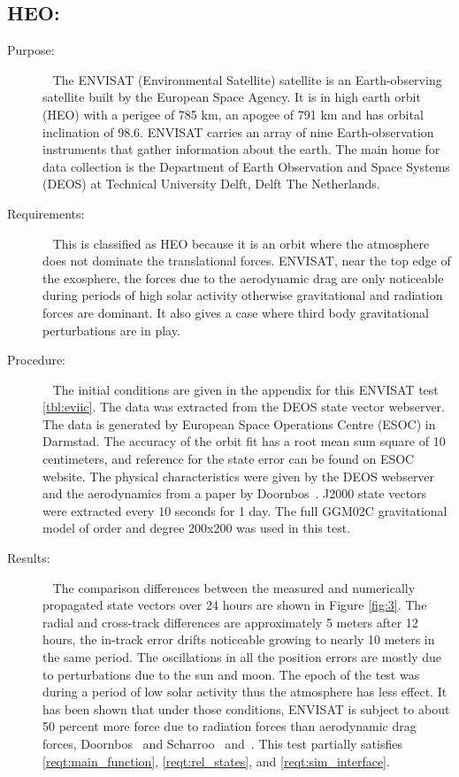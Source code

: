 \subsection{HEO:}
\label{test:evi}
\begin{description}
\item[Purpose:] \ \newline
The ENVISAT (Environmental Satellite) satellite is an Earth-observing satellite built
by the European Space Agency. It is in high earth orbit (HEO) with a perigee of 785 km,
an apogee of 791 km and has orbital inclination of 98.6.  ENVISAT carries an array of
nine Earth-observation instruments that gather information about the earth.  The main
home for data collection is the Department of Earth Observation and Space Systems (DEOS)
at Technical University Delft, Delft The Netherlands.
\item[Requirements:] \ \newline
This is classified as HEO because it is an orbit where the atmosphere does not dominate
the translational forces. ENVISAT, near the top edge of the exosphere, the forces due to
the aerodynamic drag are only noticeable during periods of high solar activity otherwise
gravitational and radiation forces are dominant.  It also gives a case where third body
gravitational perturbations are in play.
\item[Procedure:]\ \newline
The initial conditions are given in the appendix for this ENVISAT test \ref{tbl:eviic}.
The data was extracted from the DEOS state vector webserver.  The data is generated
by European Space Operations Centre (ESOC) in Darmstad. The accuracy of the orbit fit
has a root mean sum square of 10 centimeters, and reference for the state error can be
found on ESOC website. The physical characteristics were given by the DEOS webserver
and the aerodynamics from a paper by Doornbos~\cite{ers2}.  J2000 state vectors were
extracted every 10 seconds for 1 day. The full GGM02C gravitational model of order and
degree 200x200 was used in this test.
\item[Results:]\ \newline
The comparison differences between the measured and numerically propagated state vectors
over 24 hours are shown in Figure \ref{fig:3}.  The radial and cross-track differences are
approximately 5 meters after 12 hours, the in-track error drifts noticeable growing to
nearly 10 meters in the same period. The oscillations in all the position errors are mostly
due to perturbations due to the sun and moon. The epoch of the test was during a period of
low solar activity thus the atmosphere has less effect.  It has been shown that under those
conditions, ENVISAT is subject to about 50 percent more force due to radiation forces than
aerodynamic drag forces, Doornbos~\cite{ers2} and Scharroo~\cite{ers1} and~\cite{sch}.
This test partially satisfies \ref{reqt:main_function}, \ref{reqt:rel_states}, and \ref{reqt:sim_interface}.


\end{description}
